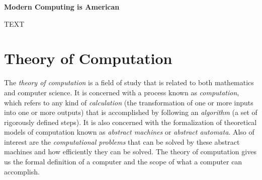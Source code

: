 \begin{tcolorbox}[breakable, enhanced, colback=textbook-blue, sharp corners]
	\vspace{2mm}
	\begin{center}
		\textbf{Modern Computing is American}
	\end{center}
	\vspace{1mm}
	TEXT
	\vspace{1mm}
\end{tcolorbox}
\vspace{7mm}


\newpage


\part*{Theory of Computation}


The \textit{theory of computation} is a field of study that is related to both mathematics and computer science. It is concerned with a process known as \textit{computation}, which refers to any kind of \textit{calculation} (the transformation of one or more inputs into one or more outputs) that is accomplished by following an \textit{algorithm} (a set of rigorously defined steps). It is also concerned with the formalization of theoretical models of computation known as \textit{abstract machines} or \textit{abstract automata}. Also of interest are the \textit{computational problems} that can be solved by these abstract machines and how efficiently they can be solved. The theory of computation gives us the formal definition of a computer and the scope of what a computer can accomplish. \\

